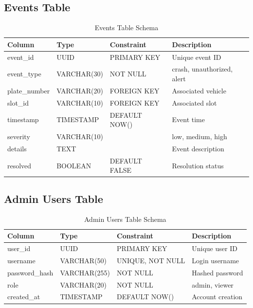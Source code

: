 \documentclass[12pt,a4paper]{report}
\begin{document}
\subsection{Events Table}

\begin{table}[H]
\centering
\caption{Events Table Schema}
\begin{tabular}{|l|l|l|l|}
\hline
\textbf{Column} & \textbf{Type} & \textbf{Constraint} & \textbf{Description} \\
\hline
event\_id & UUID & PRIMARY KEY & Unique event ID \\
\hline
event\_type & VARCHAR(30) & NOT NULL & crash, unauthorized, alert \\
\hline
plate\_number & VARCHAR(20) & FOREIGN KEY & Associated vehicle \\
\hline
slot\_id & VARCHAR(10) & FOREIGN KEY & Associated slot \\
\hline
timestamp & TIMESTAMP & DEFAULT NOW() & Event time \\
\hline
severity & VARCHAR(10) & & low, medium, high \\
\hline
details & TEXT & & Event description \\
\hline
resolved & BOOLEAN & DEFAULT FALSE & Resolution status \\
\hline
\end{tabular}
\end{table}

\subsection{Admin Users Table}

\begin{table}[H]
\centering
\caption{Admin Users Table Schema}
\begin{tabular}{|l|l|l|l|}
\hline
\textbf{Column} & \textbf{Type} & \textbf{Constraint} & \textbf{Description} \\
\hline
user\_id & UUID & PRIMARY KEY & Unique user ID \\
\hline
username & VARCHAR(50) & UNIQUE, NOT NULL & Login username \\
\hline
password\_hash & VARCHAR(255) & NOT NULL & Hashed password \\
\hline
role & VARCHAR(20) & NOT NULL & admin, viewer \\
\hline
created\_at & TIMESTAMP & DEFAULT NOW() & Account creation \\
\hline
\end{tabular}
\end{table}
\end{document}
